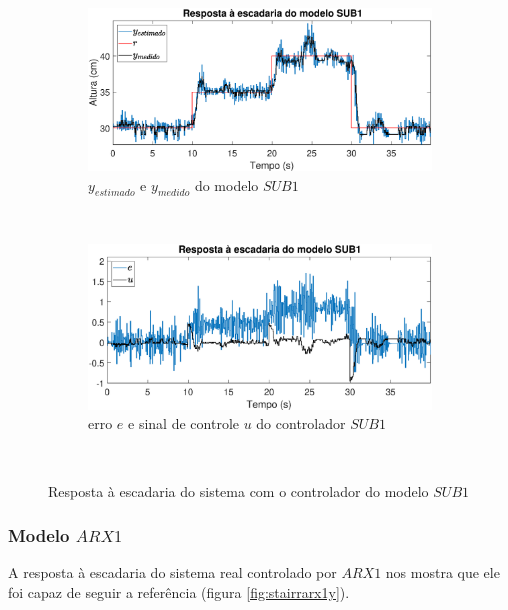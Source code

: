 \begin{figure}[htb]
	\centering
	\begin{subfigure}[t]{0.48\textwidth}
		\includegraphics[width=1\linewidth]{stairrsub1y}
		\caption[$y_{estimado}$ e $y_{medido}$ do modelo $SUB1$]{$y_{estimado}$ e $y_{medido}$ do modelo $SUB1$}
		\label{fig:stairrsub1y}
	\end{subfigure}
	~ %
	\begin{subfigure}[t]{0.48\textwidth}
		\includegraphics[width=1\linewidth]{stairrsub1e}
		\caption[erro $e$ e sinal de controle $u$ do controlador $SUB1$]{erro $e$ e sinal de controle $u$ do controlador $SUB1$}
		\label{fig:stairrsub1e}
	\end{subfigure}
	~ %
	
	\caption{Resposta à escadaria do sistema com o controlador do modelo $SUB1$}\label{fig:stairrsub1}
\end{figure}

\subsubsection{Modelo $ARX1$}
A resposta à escadaria do sistema real controlado por $ARX1$ nos mostra que ele foi capaz de seguir a referência (figura \ref{fig:stairrarx1y}).


